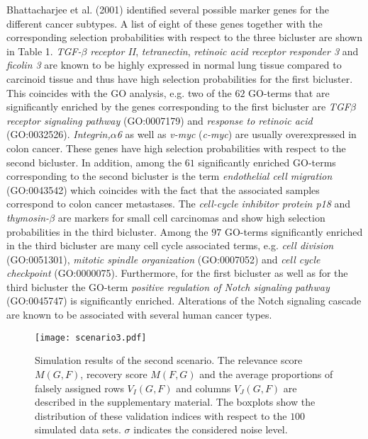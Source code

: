 \documentclass{bioinfo}
\begin{document}
Bhattacharjee et al. (2001) identified several possible marker genes for the different cancer subtypes. A list of eight of these genes together with the corresponding selection probabilities with respect to the three bicluster are shown in Table 1. \textit{TGF-$\beta$ receptor II}, \textit{tetranectin}, \textit{retinoic acid receptor responder 3} and \textit{ficolin 3} are known to be highly expressed in normal lung tissue compared to carcinoid tissue and thus have high selection probabilities for the first bicluster. This coincides with the GO analysis, e.g. two of the $62$ GO-terms that are significantly enriched by the genes corresponding to the first bicluster are \textit{TGF$\beta$ receptor signaling pathway} (GO:0007179) and \textit{response to retinoic acid} (GO:0032526). \textit{Integrin,$\alpha$6} as well as \textit{v-myc} (\textit{c-myc}) are usually overexpressed in colon cancer. These genes have high selection probabilities with respect to the second bicluster. In addition, among the $61$ significantly enriched GO-terms corresponding to the second bicluster is the term \textit{endothelial cell migration} (GO:0043542) which coincides with the fact that the associated samples correspond to colon cancer metastases. The \textit{cell-cycle inhibitor protein p18} and \textit{thymosin-$\beta$} are markers for small cell carcinomas and show high selection probabilities in the third bicluster. Among the $97$ GO-terms significantly enriched in the third bicluster are many cell cycle associated terms, e.g. \textit{cell division} (GO:0051301), \textit{mitotic spindle organization} (GO:0007052) and \textit{cell cycle checkpoint} (GO:0000075). Furthermore, for the first bicluster as well as for the third bicluster the GO-term \textit{positive regulation of Notch signaling pathway} (GO:0045747) is significantly enriched. Alterations of the Notch signaling cascade are known to be associated with several human cancer types. 
\begin{center}
\begin{figure*}[t]
\texttt{[image: scenario3.pdf]}
\caption{ Simulation results of the second scenario. The relevance score $M(G,F)$, recovery score $M(F,G)$ and the average proportions of falsely assigned rows $V_{I}(G,F)$ and columns $V_{J}(G,F)$ are described in the supplementary material. The boxplots show the distribution of these validation indices with respect to the $100$ simulated data sets. $\sigma$ indicates the considered noise level. \label{fig:03} 
}
\end{figure*}
\end{center}
\end{document}
